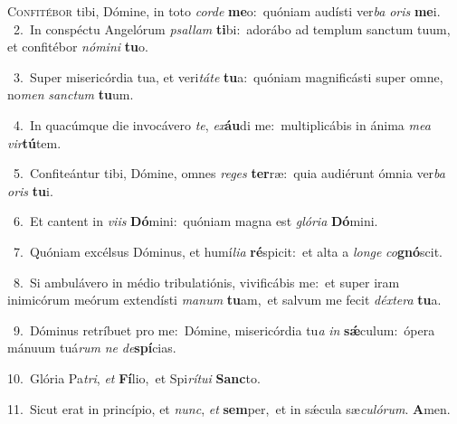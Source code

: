 \lettrine{\initial\textcolor{\initialcolor}{C}}{onfitébor} tibi, Dómine, in toto \textit{cor}\-\textit{de} \textbf{me}\-o:~\star quóniam audísti ver\textit{ba} \textit{o}\-\textit{ris} \textbf{me}\-i.\\
{\numbfont\textcolor{\numbcolor}{~2.}}~In conspéctu Angelórum \textit{psal}\-\textit{lam} \textbf{ti}\-bi:~\star adorábo ad templum sanctum tuum, et confitébor \textit{nó}\-\textit{mi}\textit{ni} \textbf{tu}\-o.\par
{\numbfont\textcolor{\numbcolor}{~3.}}~Super misericórdia tua, et veri\-\textit{tá}\-\textit{te} \textbf{tu}\-a:~\star quóniam magnificásti super omne, no\textit{men} \textit{sanc}\-\textit{tum} \textbf{tu}\-um.\par
{\numbfont\textcolor{\numbcolor}{~4.}}~In quacúmque die invocávero \textit{te}\-, \textit{ex}\-\textbf{áu}di me:~\star multiplicábis in ánima \textit{me}\-\textit{a} \textit{vir}\-\textbf{tú}tem.\par
{\numbfont\textcolor{\numbcolor}{~5.}}~Confiteántur tibi, Dómine, omnes \textit{re}\-\textit{ges} \textbf{ter}\-ræ:~\star quia audiérunt ómnia ver\textit{ba} \textit{o}\-\textit{ris} \textbf{tu}\-i.\par
{\numbfont\textcolor{\numbcolor}{~6.}}~Et cantent in \textit{vi}\-\textit{is} \textbf{Dó}\-mini:~\star quóniam magna est \textit{gló}\-\textit{ri}\textit{a} \textbf{Dó}\-mini.\par
{\numbfont\textcolor{\numbcolor}{~7.}}~Quóniam excélsus Dóminus, et humí\-\textit{li}\-\textit{a} \textbf{ré}\-spicit:~\star et alta a \textit{lon}\-\textit{ge} \textit{co}\-\textbf{gnó}scit.\par
{\numbfont\textcolor{\numbcolor}{~8.}}~Si ambulávero in médio tribulatiónis, vivificábis me:~\dagger et super iram inimicórum meórum extendísti \textit{ma}\-\textit{num} \textbf{tu}\-am,~\star et salvum me fecit \textit{déx}\-\textit{te}\textit{ra} \textbf{tu}\-a.\par
{\numbfont\textcolor{\numbcolor}{~9.}}~Dóminus retríbuet pro me:~\dagger Dómine, misericórdia tu\textit{a} \textit{in} \textbf{sǽ}\-culum:~\star ópera mánuum tuá\textit{rum} \textit{ne} \textit{de}\-\textbf{spí}cias.\par
{\numbfont\textcolor{\numbcolor}{10.}}~Glória Pa\-\textit{tri}\-, \textit{et} \textbf{Fí}\-lio,~\star et Spi\-\textit{rí}\-\textit{tu}\textit{i} \textbf{Sanc}\-to.\par
{\numbfont\textcolor{\numbcolor}{11.}}~Sicut erat in princípio, et \textit{nunc}\-, \textit{et} \textbf{sem}\-per,~\star et in sǽcula sæ\-\textit{cu}\-\textit{ló}\textit{rum}. \textbf{A}\-men.\par
